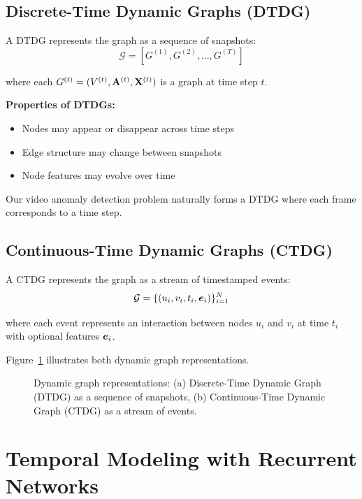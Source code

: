 \subsection{Discrete-Time Dynamic Graphs (DTDG)}

A DTDG represents the graph as a sequence of snapshots:
\begin{equation}
    \mathcal{G} = \left[G^{(1)}, G^{(2)}, \ldots, G^{(T)}\right]
\end{equation}

where each $G^{(t)} = (V^{(t)}, \mathbf{A}^{(t)}, \mathbf{X}^{(t)})$ is a graph at time step $t$.

\textbf{Properties of DTDGs:}
\begin{itemize}
    \item Nodes may appear or disappear across time steps
    \item Edge structure may change between snapshots
    \item Node features may evolve over time
\end{itemize}

Our video anomaly detection problem naturally forms a DTDG where each frame corresponds to a time step.

\subsection{Continuous-Time Dynamic Graphs (CTDG)}

A CTDG represents the graph as a stream of timestamped events:
\begin{equation}
    \mathcal{G} = \{(u_i, v_i, t_i, \bm{e}_i)\}_{i=1}^{N}
\end{equation}

where each event represents an interaction between nodes $u_i$ and $v_i$ at time $t_i$ with optional features $\bm{e}_i$.

Figure~\ref{fig:dynamic_graph_types} illustrates both dynamic graph representations.

\begin{figure}[H]
    \centering
    
    \caption{Dynamic graph representations: (a) Discrete-Time Dynamic Graph (DTDG) as a sequence of snapshots, (b) Continuous-Time Dynamic Graph (CTDG) as a stream of events.}
    \label{fig:dynamic_graph_types}
\end{figure}

\section{Temporal Modeling with Recurrent Networks}

